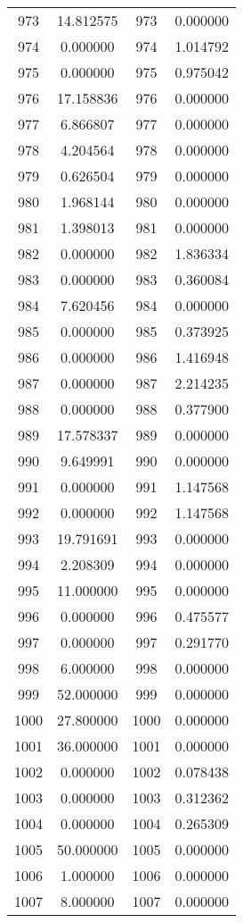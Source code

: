 \documentclass[12pt]{article}
\begin{document}
\begin{longtable}{@{}cccc@{}}
973 & 14.812575 & 973 & 0.000000 \\
974 & 0.000000 & 974 & 1.014792 \\
975 & 0.000000 & 975 & 0.975042 \\
976 & 17.158836 & 976 & 0.000000 \\
977 & 6.866807 & 977 & 0.000000 \\
978 & 4.204564 & 978 & 0.000000 \\
979 & 0.626504 & 979 & 0.000000 \\
980 & 1.968144 & 980 & 0.000000 \\
981 & 1.398013 & 981 & 0.000000 \\
982 & 0.000000 & 982 & 1.836334 \\
983 & 0.000000 & 983 & 0.360084 \\
984 & 7.620456 & 984 & 0.000000 \\
985 & 0.000000 & 985 & 0.373925 \\
986 & 0.000000 & 986 & 1.416948 \\
987 & 0.000000 & 987 & 2.214235 \\
988 & 0.000000 & 988 & 0.377900 \\
989 & 17.578337 & 989 & 0.000000 \\
990 & 9.649991 & 990 & 0.000000 \\
991 & 0.000000 & 991 & 1.147568 \\
992 & 0.000000 & 992 & 1.147568 \\
993 & 19.791691 & 993 & 0.000000 \\
994 & 2.208309 & 994 & 0.000000 \\
995 & 11.000000 & 995 & 0.000000 \\
996 & 0.000000 & 996 & 0.475577 \\
997 & 0.000000 & 997 & 0.291770 \\
998 & 6.000000 & 998 & 0.000000 \\
999 & 52.000000 & 999 & 0.000000 \\
1000 & 27.800000 & 1000 & 0.000000 \\
1001 & 36.000000 & 1001 & 0.000000 \\
1002 & 0.000000 & 1002 & 0.078438 \\
1003 & 0.000000 & 1003 & 0.312362 \\
1004 & 0.000000 & 1004 & 0.265309 \\
1005 & 50.000000 & 1005 & 0.000000 \\
1006 & 1.000000 & 1006 & 0.000000 \\
1007 & 8.000000 & 1007 & 0.000000 \\

\end{longtable}
\end{document}
